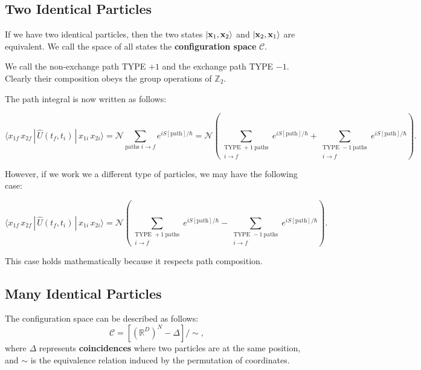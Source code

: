 \subsection{Two Identical Particles}


If we have two identical particles, then the two states $| \vb x_1, \vb x_2 \rangle$  and $| \vb x_2, \vb x_1 \rangle$ are equivalent. We call the space of all states the \textbf{configuration space} $\mathcal{C}$. 



We call the non-exchange path TYPE $+1$ and the exchange path TYPE $-1$. Clearly their composition obeys the group operations of $\mathbb{Z}_2$. 


The path integral is now written as follows:

\begin{equation*}
\label{eq:3.4}
\langle x_{1f}\,x_{2f}\,|\,\hat U(t_f,t_i)\,|\,x_{1i}\,x_{2i}\rangle
= \mathcal{N}\sum_{\text{paths } i\to f} e^{i S[\text{path}]/\hbar}
= \mathcal{N}\!\left(
\sum_{\substack{\text{TYPE }+1\ \text{paths}\\ i\to f}} e^{i S[\text{path}]/\hbar}
+ \sum_{\substack{\text{TYPE }-1\ \text{paths}\\ i\to f}} e^{i S[\text{path}]/\hbar}
\right).
\end{equation*}



However, if we work we a different type of particles, we may have the following case:

\begin{equation*}
\label{eq:3.5}
\langle x_{1f}\,x_{2f}\,|\,\hat U(t_f,t_i)\,|\,x_{1i}\,x_{2i}\rangle
= \mathcal{N}\!\left(
\sum_{\substack{\text{TYPE }+1\ \text{paths}\\ i\to f}} e^{i S[\text{path}]/\hbar}
- \sum_{\substack{\text{TYPE }-1\ \text{paths}\\ i\to f}} e^{i S[\text{path}]/\hbar}
\right).
\end{equation*}

This case holds mathematically because it respects path composition. 


\subsection{Many Identical Particles}

The configuration space can be described as follows:
$$
\mathcal{C} = [(\mathbb{R}^D)^N - \Delta] / \sim 
,$$
where $\Delta$ represents \textbf{coincidences} where two particles are at the same position, and $\sim $ is the equivalence relation induced by the permutation of coordinates.

